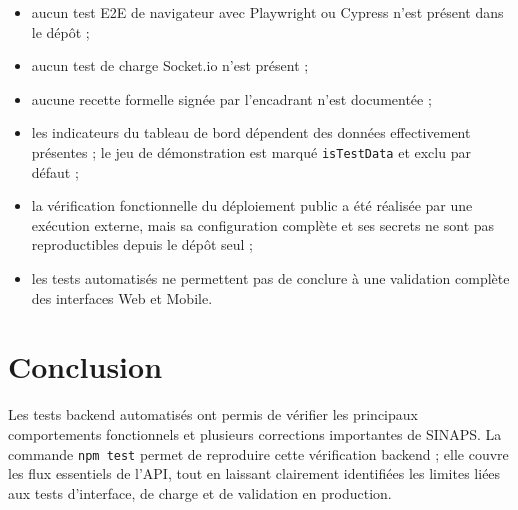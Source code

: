\begin{itemize}[leftmargin=1.4em]
  \item aucun test E2E de navigateur avec Playwright ou Cypress n'est présent dans le dépôt ;
  \item aucun test de charge Socket.io n'est présent ;
  \item aucune recette formelle signée par l'encadrant n'est documentée ;
  \item les indicateurs du tableau de bord dépendent des données effectivement présentes ; le jeu de démonstration est marqué \texttt{isTestData} et exclu par défaut ;
  \item la vérification fonctionnelle du déploiement public a été réalisée par une exécution externe, mais sa configuration complète et ses secrets ne sont pas reproductibles depuis le dépôt seul ;
  \item les tests automatisés ne permettent pas de conclure à une validation complète des interfaces Web et Mobile.
\end{itemize}

\section{Conclusion}

Les tests backend automatisés ont permis de vérifier les principaux comportements fonctionnels et plusieurs corrections importantes de SINAPS. La commande \texttt{npm test} permet de reproduire cette vérification backend ; elle couvre les flux essentiels de l'API, tout en laissant clairement identifiées les limites liées aux tests d'interface, de charge et de validation en production.
